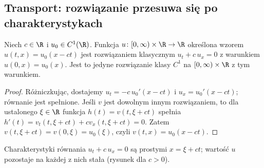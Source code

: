\subsection{Transport: rozwiązanie przesuwa się po charakterystykach}

\begin{stwierdzenie}
\label{prop:transport}
Niech $c\in\R$ i $u_0\in C^1(\R)$. Funkcja
$u\colon[0,\infty)\times\R\to\R$ określona wzorem
$u(t,x)=u_0(x-ct)$ jest rozwiązaniem klasycznym
$u_t+c\,u_x=0$ z warunkiem $u(0,x)=u_0(x)$.
Jest to jedyne rozwiązanie klasy $C^1$ na
$[0,\infty)\times\R$ z tym warunkiem.
\end{stwierdzenie}
\begin{proof}
Różniczkując, dostajemy $u_t=-c\,u_0'(x-ct)$
i $u_x=u_0'(x-ct)$; równanie jest spełnione.
Jeśli $v$ jest dowolnym innym rozwiązaniem, to dla
ustalonego $\xi\in\R$ funkcja
$h(t)=v(t,\xi+ct)$ spełnia
$h'(t)=v_t(t,\xi+ct)+c v_x(t,\xi+ct)=0$.
Zatem $v(t,\xi+ct)=v(0,\xi)=u_0(\xi)$, czyli
$v(t,x)=u_0(x-ct)$.
\end{proof}

\begin{center}
\par\smallskip\small
Charakterystyki równania $u_t+c\,u_x=0$ są prostymi $x=\xi+ct$;
wartość $u$ pozostaje na każdej z nich stała (rysunek dla $c>0$).
\end{center}

